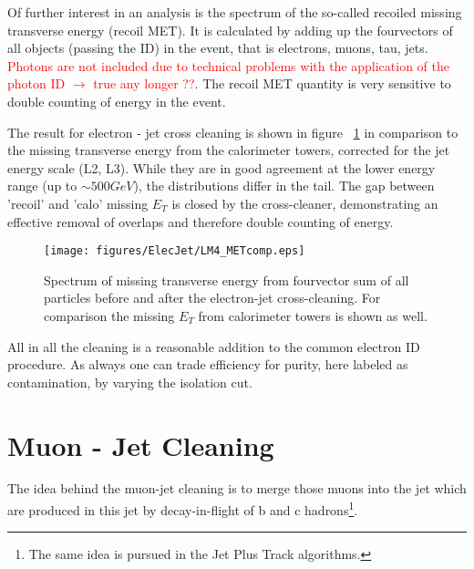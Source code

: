 \documentclass{cmspaper}
\begin{document}
Of further interest in an analysis is the spectrum of the so-called recoiled
missing transverse energy (recoil MET). It is calculated by adding up the
fourvectors of all objects (passing the ID) in the event, that is electrons,
muons, tau, jets. \textcolor{red}{Photons are not included due to technical problems with the
application of the photon ID \(\rightarrow\) true any longer ??}.  The recoil MET quantity is very sensitive to
double counting of energy in the event.

The result for electron - jet cross cleaning is shown in figure
~\ref{fig:met_ElecJet} in comparison to the missing transverse energy from the
calorimeter towers, corrected for the jet energy scale (L2, L3). While they are
in good agreement at the lower energy range (up to \(\sim 500 GeV\)), the
distributions differ in the tail. The gap between 'recoil' and 'calo' missing
$E_T$ is closed by the cross-cleaner, demonstrating an effective removal of
overlaps and therefore double counting of energy.

\begin{figure}[hb]
\begin{center}
    \texttt{[image: figures/ElecJet/LM4\_METcomp.eps]}
    \caption{Spectrum of missing transverse energy from fourvector sum of all
    particles before and after the electron-jet cross-cleaning. For comparison
    the missing $E_T$ from calorimeter towers is shown as well.}
\label{fig:met_ElecJet}
\end{center}
\end{figure}
All in all the cleaning is a reasonable addition to the
common electron ID procedure. As always one can trade efficiency for purity,
here labeled as contamination, by varying the isolation cut.

\clearpage


\section{Muon - Jet Cleaning}
The idea behind the muon-jet cleaning is to merge those muons into the jet which
are produced in this jet by decay-in-flight of b and c hadrons\footnote{The same
idea is pursued in the Jet Plus Track algorithms.}.
\end{document}
